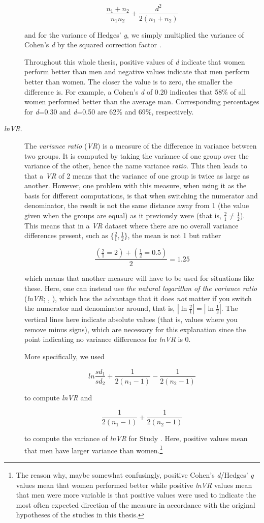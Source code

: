 \begin{description}
$$\frac{n_1+n_2}{{n_1}{n_2}}+\frac{d^2}{2(n_1+n_2)}$$

and for the variance of Hedges' \emph{g}, we simply multiplied the variance of Cohen's \emph{d} by the squared correction factor \parencite{Del2013}.

Throughout this whole thesis, positive values of \emph{d} indicate that women perform better than men and negative values indicate that men perform better than women. The closer the value is to zero, the smaller the difference is. For example, a Cohen's \emph{d} of 0.20 indicates that 58\% of all women performed better than the average man. Corresponding percentages for \emph{d}=0.30 and \emph{d}=0.50 are 62\% and 69\%, respectively.

\item [\emph{lnVR}.] The \emph{variance ratio} (\emph{VR}) is a measure of the difference in variance between two groups. It is computed by taking the variance of one group over the variance of the other, hence the name variance \emph{ratio}. This then leads to that a \emph{VR} of 2 means that the variance of one group is twice as large as another. However, one problem with this measure, when using it as the basis for different computations, is that when switching the numerator and denominator, the result is not the same distance away from 1 (the value given when the groups are equal) as it previously were (that is, $\frac{2}{1}\neq\frac{1}{2}$). This means that in a \emph{VR} dataset where there are no overall variance differences present, such as $\{\frac{2}{1},\frac{1}{2}\}$, the mean is not 1 but rather

$$\frac{(\frac{2}{1}=2)+(\frac{1}{2}=0.5)}{2}=1.25$$

which means that another measure will have to be used for situations like these. Here, one can instead use \emph{the natural logarithm of the variance ratio} (\emph{lnVR}; \citeauthor{Feingold1992b}, \citeyear{Feingold1992b}), which has the advantage that it does \emph{not} matter if you switch the numerator and denominator around, that is, $|\ln{\frac{2}{1}}|=|\ln{\frac{1}{2}}|$. The vertical lines here indicate absolute values (that is, values where you remove minus signs), which are necessary for this explanation since the point indicating no variance differences for \emph{lnVR} is 0.

More specifically, we used

$$ln\frac{sd_1}{sd_2}+\frac{1}{2({n_1}-1)}-\frac{1}{2({n_2}-1)}$$

to compute \emph{lnVR} and

$$\frac{1}{2({n_1}-1)}+\frac{1}{2({n_2}-1)}$$

to compute the variance of \emph{lnVR} \parencite{Nakagawa2015} for Study . Here, positive values mean that men have larger variance than women.\footnote{The reason why, maybe somewhat confusingly, positive Cohen's \emph{d}/Hedges' \emph{g} values mean that women performed better while positive \emph{lnVR} values mean that men were more variable is that positive values were used to indicate the most often expected direction of the measure in accordance with the original hypotheses of the studies in this thesis.} \end{description}

